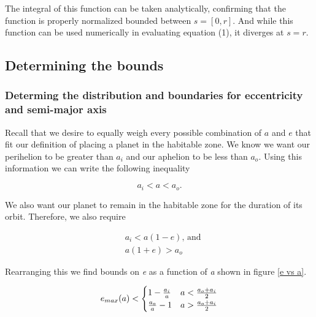 \documentclass{article}
\begin{document}
	The integral of this function can be taken analytically, confirming that the function is properly normalized bounded between $s = [0,r]$. And while this function can be used numerically in evaluating equation (1), it diverges at $s = r$. 
	
		
	\subsection{Determining the bounds}
	\subsubsection{Determing the distribution and boundaries for eccentricity and semi-major axis}
	Recall that we desire to equally weigh every possible combination of $a$ and $e$ that fit our definition of placing a planet in the habitable zone. We know we want our perihelion to be greater than $a_{i}$ and our aphelion to be less than $a_{o}$. Using this information we can write the following inequality
	
	\begin{equation}
	a_{i} < a < a_{o}.
	\end{equation}
	
	We also want our planet to remain in the habitable zone for the duration of its orbit. Therefore, we also require 
	
	\begin{align}
	&a_{i} < a(1-e) \mbox{, and} \\
	&a(1+e) > a_{o}
	\end{align}
	
	Rearranging this we find bounds on \textit{e} as a function of \textit{a} shown in figure \ref{e vs a}.
	
	\[	
	\begin{array}{@{} r @{} c @{} l @{} }
	e_{max}(a) < 
	\begin{cases}
	1 - \frac{a_{i}}{a} & a < \frac{a_{o} + a_{i}}{2}\\
	\frac{a_{o}}{a} - 1 & a > \frac{a_{o} + a_{i}}{2}
	\end{cases}
	\end{array}
	\]
	
\end{document}
